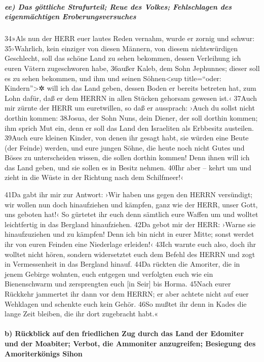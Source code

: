 \hypertarget{ee-das-guxf6ttliche-strafurteil-reue-des-volkes-fehlschlagen-des-eigenmuxe4chtigen-eroberungsversuches}{%
\subparagraph{ee) Das göttliche Strafurteil; Reue des Volkes;
Fehlschlagen des eigenmächtigen
Eroberungsversuches}\label{ee-das-guxf6ttliche-strafurteil-reue-des-volkes-fehlschlagen-des-eigenmuxe4chtigen-eroberungsversuches}}

34»Als nun der HERR euer lautes Reden vernahm, wurde er zornig und
schwur: 35›Wahrlich, kein einziger von diesen Männern, von diesem
nichtswürdigen Geschlecht, soll das schöne Land zu sehen bekommen,
dessen Verleihung ich euren Vätern zugeschworen habe, 36außer Kaleb, dem
Sohn Jephunnes; dieser soll es zu sehen bekommen, und ihm und seinen
Söhnen\textless sup title=``oder: Kindern''\textgreater✲ will ich das
Land geben, dessen Boden er bereits betreten hat, zum Lohn dafür, daß er
dem HERRN in allen Stücken gehorsam gewesen ist.‹ 37Auch mir zürnte der
HERR um euretwillen, so daß er aussprach: ›Auch du sollst nicht dorthin
kommen: 38Josua, der Sohn Nuns, dein Diener, der soll dorthin kommen;
ihm sprich Mut ein, denn er soll das Land den Israeliten als Erbbesitz
austeilen. 39Auch eure kleinen Kinder, von denen ihr gesagt habt, sie
würden eine Beute (der Feinde) werden, und eure jungen Söhne, die heute
noch nicht Gutes und Böses zu unterscheiden wissen, die sollen dorthin
kommen! Denn ihnen will ich das Land geben, und sie sollen es in Besitz
nehmen. 40Ihr aber -- kehrt um und zieht in die Wüste in der Richtung
nach dem Schilfmeer!‹

41Da gabt ihr mir zur Antwort: ›Wir haben uns gegen den HERRN
versündigt; wir wollen nun doch hinaufziehen und kämpfen, ganz wie der
HERR, unser Gott, uns geboten hat!‹ So gürtetet ihr euch denn sämtlich
eure Waffen um und wolltet leichtfertig in das Bergland hinaufziehen.
42Da gebot mir der HERR: ›Warne sie hinaufzuziehen und zu kämpfen! Denn
ich bin nicht in eurer Mitte; sonst werdet ihr von euren Feinden eine
Niederlage erleiden!‹ 43Ich warnte euch also, doch ihr wolltet nicht
hören, sondern widersetztet euch dem Befehl des HERRN und zogt in
Vermessenheit in das Bergland hinauf. 44Da rückten die Amoriter, die in
jenem Gebirge wohnten, euch entgegen und verfolgten euch wie ein
Bienenschwarm und zersprengten euch {[}in Seir{]} bis Horma. 45Nach
eurer Rückkehr jammertet ihr dann vor dem HERRN; er aber achtete nicht
auf euer Wehklagen und schenkte euch kein Gehör. 46So mußtet ihr denn in
Kades die lange Zeit bleiben, die ihr dort zugebracht habt.«

\hypertarget{b-ruxfcckblick-auf-den-friedlichen-zug-durch-das-land-der-edomiter-und-der-moabiter-verbot-die-ammoniter-anzugreifen-besiegung-des-amoriterkuxf6nigs-sihon}{%
\paragraph{b) Rückblick auf den friedlichen Zug durch das Land der
Edomiter und der Moabiter; Verbot, die Ammoniter anzugreifen; Besiegung
des Amoriterkönigs
Sihon}\label{b-ruxfcckblick-auf-den-friedlichen-zug-durch-das-land-der-edomiter-und-der-moabiter-verbot-die-ammoniter-anzugreifen-besiegung-des-amoriterkuxf6nigs-sihon}}

